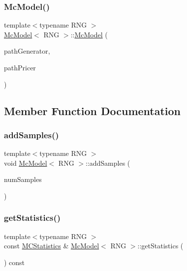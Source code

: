 \subsubsection{\texorpdfstring{Mc\+Model()}{McModel()}}
{\footnotesize\ttfamily template$<$typename R\+NG $>$ \\
\hyperlink{class_mc_model}{Mc\+Model}$<$ R\+NG $>$\+::\hyperlink{class_mc_model}{Mc\+Model} (\begin{DoxyParamCaption}\item[{const std\+::shared\+\_\+ptr$<$ \hyperlink{class_path_generator}{Path\+Generator}$<$ R\+NG $>$$>$ \&}]{path\+Generator,  }\item[{const std\+::shared\+\_\+ptr$<$ \hyperlink{class_path_pricer}{Path\+Pricer} $>$}]{path\+Pricer }\end{DoxyParamCaption})}



\subsection{Member Function Documentation}
\hypertarget{class_mc_model_a9ed7099395a0eae21fd3b719fab6b9de}{}\label{class_mc_model_a9ed7099395a0eae21fd3b719fab6b9de} 
\subsubsection{\texorpdfstring{add\+Samples()}{addSamples()}}
{\footnotesize\ttfamily template$<$typename R\+NG $>$ \\
void \hyperlink{class_mc_model}{Mc\+Model}$<$ R\+NG $>$\+::add\+Samples (\begin{DoxyParamCaption}\item[{unsigned long}]{num\+Samples }\end{DoxyParamCaption})}

\hypertarget{class_mc_model_afb59f4097bca3e5c22920cec8ce8b80f}{}\label{class_mc_model_afb59f4097bca3e5c22920cec8ce8b80f} 
\subsubsection{\texorpdfstring{get\+Statistics()}{getStatistics()}}
{\footnotesize\ttfamily template$<$typename R\+NG $>$ \\
const \hyperlink{class_m_c_statistics}{M\+C\+Statistics} \& \hyperlink{class_mc_model}{Mc\+Model}$<$ R\+NG $>$\+::get\+Statistics (\begin{DoxyParamCaption}{ }\end{DoxyParamCaption}) const}



